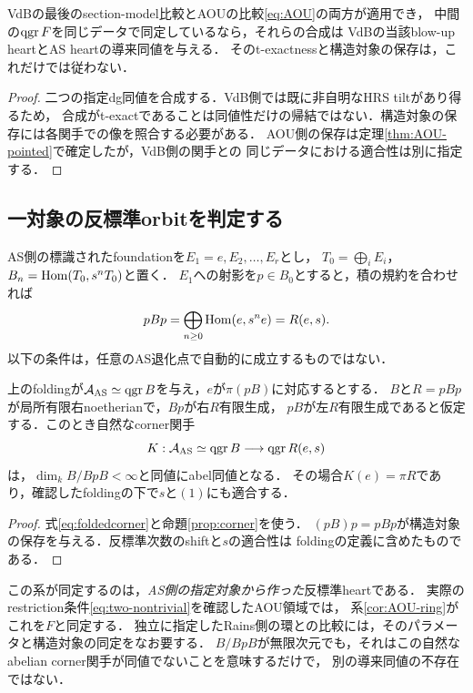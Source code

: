 \begin{corollary}\label{cor:VdBAS}
VdBの最後のsection-model比較とAOUの比較\eqref{eq:AOU}の両方が適用でき，
中間の$\operatorname{qgr} F$を同じデータで同定しているなら，それらの合成は
VdBの当該blow-up heartとAS heartの導来同値を与える．
そのt-exactnessと構造対象の保存は，これだけでは従わない．
\end{corollary}
\begin{proof}
二つの指定dg同値を合成する．VdB側では既に非自明なHRS tiltがあり得るため，
合成がt-exactであることは同値性だけの帰結ではない．構造対象の保存には各関手での像を照合する必要がある．
AOU側の保存は定理\ref{thm:AOU-pointed}で確定したが，VdB側の関手との
同じデータにおける適合性は別に指定する．
\end{proof}

\subsection{一対象の反標準orbitを判定する}
AS側の標識されたfoundationを$E_1=e,E_2,\ldots,E_r$とし，
$T_0=\bigoplus_iE_i$，$B_n=\operatorname{Hom}(T_0,s^nT_0)$と置く．
$E_1$への射影を$p\in B_0$とすると，積の規約を合わせれば
\begin{equation}\label{eq:foldedcorner}
pBp=\bigoplus_{n\ge0}\operatorname{Hom}(e,s^ne)=R(e,s).
\end{equation}
以下の条件は，任意のAS退化点で自動的に成立するものではない．

\begin{corollary}[AS--反標準のabel同値判定]\label{cor:ASac}
上のfoldingが$\mathcal A_{\mathrm{AS}}\simeq\operatorname{qgr} B$を与え，$e$が$\pi(pB)$に対応するとする．
$B$と$R=pBp$が局所有限右noetherianで，$Bp$が右$R$有限生成，
$pB$が左$R$有限生成であると仮定する．このとき自然なcorner関手
\[
K:\mathcal A_{\mathrm{AS}}\simeq\operatorname{qgr} B\longrightarrow\operatorname{qgr} R(e,s)
\]
は，$\dim_k B/BpB<\infty$と同値にabel同値となる．
その場合$K(e)=\pi R$であり，確認したfoldingの下で$s$と$(1)$にも適合する．
\end{corollary}
\begin{proof}
式\eqref{eq:foldedcorner}と命題\ref{prop:corner}を使う．
$(pB)p=pBp$が構造対象の保存を与える．反標準次数のshiftと$s$の適合性は
foldingの定義に含めたものである．
\end{proof}

この系が同定するのは，\emph{AS側の指定対象から作った}反標準heartである．
実際のrestriction条件\eqref{eq:two-nontrivial}を確認したAOU領域では，
系\ref{cor:AOU-ring}がこれを$F$と同定する．
独立に指定したRains側の環との比較には，そのパラメータと構造対象の同定をなお要する．
$B/BpB$が無限次元でも，それはこの自然なabelian corner関手が同値でないことを意味するだけで，
別の導来同値の不存在ではない．

